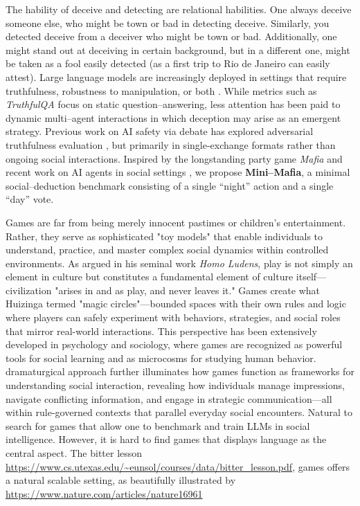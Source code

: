 \documentclass{article}
\begin{document}
The hability of deceive and detecting are relational habilities. One always deceive someone else, who might be town or bad in detecting deceive. Similarly, you detected deceive from a deceiver who might be town or bad. Additionally, one might stand out at deceiving in certain background, but in a different one, might be taken as a fool easily detected (as a first trip to Rio de Janeiro can easily attest).  
Large language models are increasingly deployed in settings that require truthfulness, robustness to manipulation, or both \citep{bubeck2023sparks, perez2023discovering}.  While metrics such as \emph{TruthfulQA} focus on static question--answering, less attention has been paid to dynamic multi--agent interactions in which deception may arise as an emergent strategy. Previous work on AI safety via debate has explored adversarial truthfulness evaluation \citep{irving2018ai}, but primarily in single-exchange formats rather than ongoing social interactions. Inspired by the longstanding party game \emph{Mafia} and recent work on AI agents in social settings \citep{park2023generative}, we propose \textbf{Mini--Mafia}, a minimal social--deduction benchmark consisting of a single ``night'' action and a single ``day'' vote.

Games are far from being merely innocent pastimes or children's entertainment. Rather, they serve as sophisticated "toy models" that enable individuals to understand, practice, and master complex social dynamics within controlled environments. As \citet{huizinga1938homo} argued in his seminal work \emph{Homo Ludens}, play is not simply an element in culture but constitutes a fundamental element of culture itself—civilization "arises in and as play, and never leaves it." Games create what Huizinga termed "magic circles"—bounded spaces with their own rules and logic where players can safely experiment with behaviors, strategies, and social roles that mirror real-world interactions. This perspective has been extensively developed in psychology and sociology, where games are recognized as powerful tools for social learning \citep{bandura1977social, raybourn2004applying} and as microcosms for studying human behavior. \citet{goffman1961encounters, goffman1974frame} dramaturgical approach further illuminates how games function as frameworks for understanding social interaction, revealing how individuals manage impressions, navigate conflicting information, and engage in strategic communication—all within rule-governed contexts that parallel everyday social encounters. 
Natural to search for games that allow one to benchmark and train LLMs in social intelligence. However, it is hard to find games that displays language as the central aspect.
The bitter lesson \url{https://www.cs.utexas.edu/~eunsol/courses/data/bitter_lesson.pdf}, games offers a natural scalable setting, as beautifully illustrated by \url{https://www.nature.com/articles/nature16961}
\end{document}

